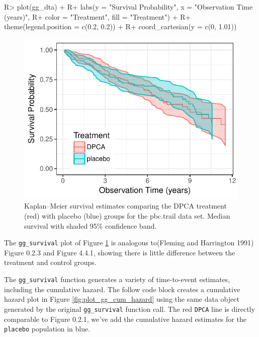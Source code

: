 \documentclass[article, nojss]{jss}
\begin{document}
\begin{Schunk}
\begin{Sinput}
R> plot(gg_dta) +
R+   labs(y = "Survival Probability", x = "Observation Time (years)",
R+        color = "Treatment", fill = "Treatment") +
R+   theme(legend.position = c(0.2, 0.2)) +
R+   coord_cartesian(y = c(0, 1.01))
\end{Sinput}
\begin{figure}[!htb]

{\centering \includegraphics{rfs-plot_gg_survival-1}

}

\caption[Kaplan--Meier survival estimates comparing the DPCA treatment (red) with placebo (blue) groups for the pbc.trail data set]{Kaplan--Meier survival estimates comparing the DPCA treatment (red) with placebo (blue) groups for the pbc.trail data set. Median survival with shaded 95\% confidence band.}\label{fig:plot_gg_survival}
\end{figure}
\end{Schunk}

The \texttt{gg\_survival} plot of Figure \ref{fig:plot_gg_survival} is
analogous to(Fleming and Harrington 1991) Figure 0.2.3 and Figure 4.4.1,
showing there is little difference between the treatment and control
groups.

The \texttt{gg\_survival} function generates a variety of time-to-event
estimates, including the cumulative hazard. The follow code block
creates a cumulative hazard plot \cite[Figure 0.2.1]{fleming:1991} in
Figure \ref{fig:plot_gg_cum_hazard} using the same data object generated
by the original \texttt{gg\_survival} function call. The red
\texttt{DPCA} line is directly comparable to Figure 0.2.1, we've add the
cumulative hazard estimates for the \texttt{placebo} population in blue.
\end{document}
